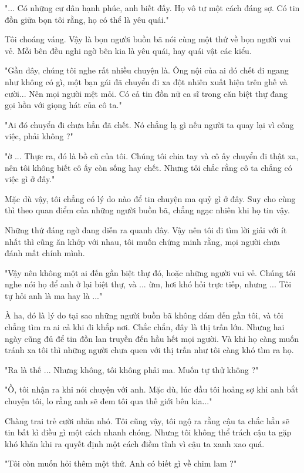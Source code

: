 "... Có những cư dân hạnh phúc, anh biết đấy. Họ vô tư một cách đáng sợ. Có tin đồn giữa bọn tôi rằng, họ có thể là yêu quái."

Tôi choáng váng. Vậy là bọn người buồn bã nói cùng một thứ về bọn người vui vẻ. Mỗi bên đều nghi ngờ bên kia là yêu quái, hay quái vật các kiểu.

"Gần đây, chúng tôi nghe rất nhiều chuyện là. Ông nội của ai đó chết đi ngang như không có gì, một bạn gái đã chuyển đi xa đột nhiên xuất hiện trên ghế và cười... Nên mọi người mệt mỏi. Có cả tin đồn nữ ca sĩ trong căn biệt thự đang gọi hồn với giọng hát của cô ta."

"Ai đó chuyển đi chưa hẳn đã chết. Nó chẳng lạ gì nếu người ta quay lại vì công việc, phải không ?"

"ờ ... Thực ra, đó là bồ cũ của tôi. Chúng tôi chia tay và cô ấy chuyển đi thật xa, nên tôi không biết cô ấy còn sống hay chết. Nhưng tôi chắc rằng cô ta chẳng có việc gì ở đây."

Mặc dù vậy, tôi chẳng có lý do nào để tin chuyện ma quỷ gì ở đây. Suy cho cùng thì theo quan điểm của những người buồn bã, chẳng ngạc nhiên khi họ tin vậy.

Những thứ đáng ngờ đang diễn ra quanh đây. Vậy nên tôi đi tìm lời giải với ít nhất thì cũng ăn khớp với nhau, tôi muốn chứng minh rằng, mọi người chưa đánh mất chính mình.

"Vậy nên không một ai đến gần biệt thự đó, hoặc những người vui vẻ. Chúng tôi nghe nói họ để anh ở lại biệt thự, và ... ừm, hơi khó hỏi trực tiếp, nhưng ... Tôi tự hỏi anh là ma hay là ..."

À ha, đó là lý do tại sao những người buồn bã không dám đến gần tôi, và tôi chẳng tìm ra ai cả khi đi khắp nơi. Chắc chắn, đây là thị trấn lớn. Nhưng hai ngày cũng đủ để tin đồn lan truyền đến hầu hết mọi người. Và khi họ càng muốn tránh xa tôi thì những người chưa quen với thị trấn như tôi càng khó tìm ra họ.

"Ra là thế ... Nhưng không, tôi không phải ma. Muốn tự thử không ?"

"Ồ, tôi nhận ra khi nói chuyện với anh. Mặc dù, lúc đầu tôi hoảng sợ khi anh bắt chuyện tôi, lo rằng anh sẽ đem tôi qua thế giới bên kia..."

Chàng trai trẻ cười nhăn nhó. Tôi cũng vậy, tôi ngộ ra rằng cậu ta chắc hẳn sẽ tin bất kì điều gì một cách nhanh chóng. Nhưng tôi không thể trách cậu ta gặp khó khăn khi ra quyết định một cách điềm tĩnh vì cậu ta xanh xao quá.

"Tôi còn muốn hỏi thêm một thứ. Anh có biết gì về chim lam ?"

